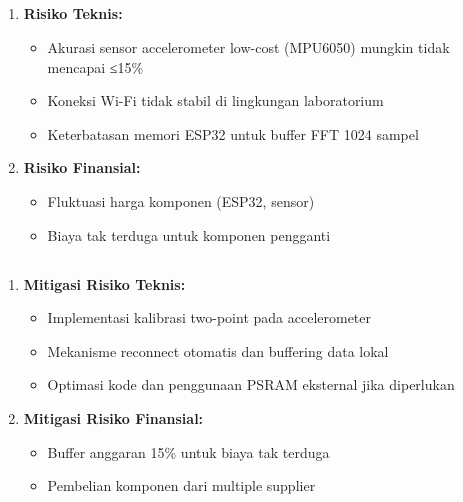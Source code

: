 \documentclass{elsinta}
\begin{document}
\subsection{\TechFinancialRiskTitle}

\begin{enumerate}
    \item \textbf{Risiko Teknis:}
    \begin{itemize}
        \item Akurasi sensor accelerometer low-cost (MPU6050) mungkin tidak mencapai ≤15\%
        \item Koneksi Wi-Fi tidak stabil di lingkungan laboratorium
        \item Keterbatasan memori ESP32 untuk buffer FFT 1024 sampel
    \end{itemize}
    \item \textbf{Risiko Finansial:}
    \begin{itemize}
        \item Fluktuasi harga komponen (ESP32, sensor)
        \item Biaya tak terduga untuk komponen pengganti
    \end{itemize}
\end{enumerate}

\subsection{\RiskMitigationTitle}

\begin{enumerate}
    \item \textbf{Mitigasi Risiko Teknis:}
    \begin{itemize}
        \item Implementasi kalibrasi two-point pada accelerometer
        \item Mekanisme reconnect otomatis dan buffering data lokal
        \item Optimasi kode dan penggunaan PSRAM eksternal jika diperlukan
    \end{itemize}
    \item \textbf{Mitigasi Risiko Finansial:}
    \begin{itemize}
        \item Buffer anggaran 15\% untuk biaya tak terduga
        \item Pembelian komponen dari multiple supplier
    \end{itemize}
\end{enumerate}
\end{document}
